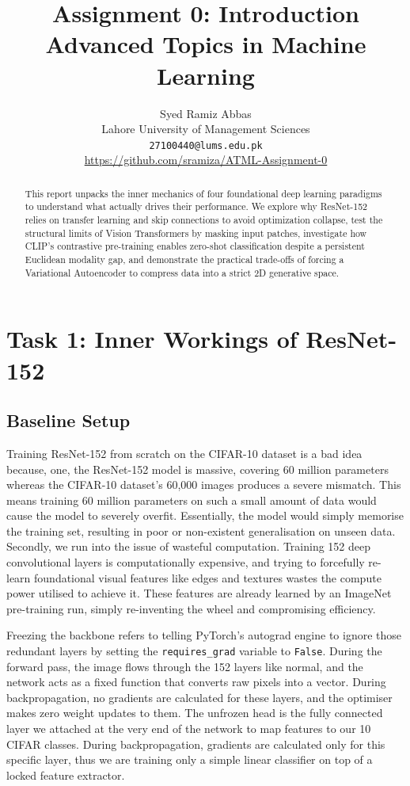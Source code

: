 \documentclass{article}
\title{Assignment 0: Introduction \\ Advanced Topics in Machine Learning}
\author{%
      Syed Ramiz Abbas \\
      Lahore University of Management Sciences \\
      \texttt{27100440@lums.edu.pk} \\
      \url{https://github.com/sramiza/ATML-Assignment-0}
    }
\begin{document}
    \maketitle
    
    \begin{abstract} 
    This report unpacks the inner mechanics of four foundational deep learning paradigms to understand what actually drives their performance. We explore why ResNet-152 relies on transfer learning and skip connections to avoid optimization collapse, test the structural limits of Vision Transformers by masking input patches, investigate how CLIP's contrastive pre-training enables zero-shot classification despite a persistent Euclidean modality gap, and demonstrate the practical trade-offs of forcing a Variational Autoencoder to compress data into a strict 2D generative space. 
    \end{abstract}
    
    \section{Task 1: Inner Workings of ResNet-152}
    
    \subsection{Baseline Setup}
    Training ResNet-152 from scratch on the CIFAR-10 dataset is a bad idea because, one, the ResNet-152 model is massive, covering 60 million parameters whereas the CIFAR-10 dataset's 60,000 images produces a severe mismatch. This means training 60 million parameters on such a small amount of data would cause the model to severely overfit. Essentially, the model would simply memorise the training set, resulting in poor or non-existent generalisation on unseen data. Secondly, we run into the issue of wasteful computation. Training 152 deep convolutional layers is computationally expensive, and trying to forcefully re-learn foundational visual features like edges and textures wastes the compute power utilised to achieve it. These features are already learned by an ImageNet pre-training run, simply re-inventing the wheel and compromising efficiency.
    
    Freezing the backbone refers to telling PyTorch's autograd engine to ignore those redundant layers by setting the \texttt{requires\_grad} variable to \texttt{False}. During the forward pass, the image flows through the 152 layers like normal, and the network acts as a fixed function that converts raw pixels into a vector. During backpropagation, no gradients are calculated for these layers, and the optimiser makes zero weight updates to them. The unfrozen head is the fully connected layer we attached at the very end of the network to map features to our 10 CIFAR classes. During backpropagation, gradients are calculated only for this specific layer, thus we are training only a simple linear classifier on top of a locked feature extractor.
    
\end{document}
